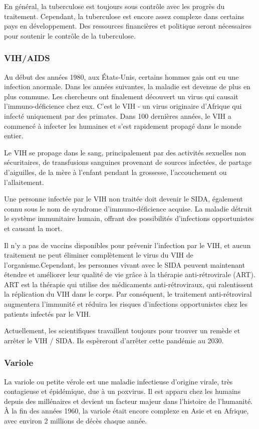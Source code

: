 En général, la tuberculose est toujours sous contrôle avec les progrès du traitement. Cependant, la tuberculose est encore assez complexe dans certains pays en développement. Des ressources financières et politique seront nécessaires pour soutenir le contrôle de la tuberculose.
\subsubsection{VIH/AIDS}

Au début des années 1980, aux États-Unis, certains hommes gais ont eu une infection anormale. Dans les années suivantes, la maladie est devenue de plus en plus commune. Les chercheurs ont finalement découvert un virus qui causait l'immuno-déficience chez eux. C'est le VIH - un virus originaire d'Afrique qui infecté uniquement par des primates. Dans 100 dernières années, le VIH a commencé à infecter les humaines et s'est rapidement propagé dans le monde entier. 

Le VIH se propage dans le sang, principalement par des activités sexuelles non sécuritaires, de transfusions sanguines provenant de sources infectées, de partage d'aiguilles, de la mère à l'enfant pendant la grossesse, l'accouchement ou l'allaitement.

Une personne infectée par le VIH non traitée doit devenir le SIDA, également connu sous le nom de syndrome d'immuno-déficience acquise. La maladie détruit le système immunitaire humain, offrant des possibilités d'infections opportunistes et causant la mort.

Il n'y a pas de vaccins disponibles pour prévenir l'infection par le VIH, et aucun traitement ne peut éliminer complètement le virus du VIH de l'organisme.Cependant, les personnes vivant avec le SIDA peuvent maintenant étendre et améliorer leur qualité de vie grâce à la thérapie anti-rétrovirale (ART). ART est la thérapie qui utilise des médicaments anti-rétroviraux, qui ralentissent la réplication du VIH dans le corps. Par conséquent, le traitement anti-rétroviral augmentera l'immunité et réduira les risques d'infections opportunistes chez les patients infectés par le VIH.

Actuellement, les scientifiques travaillent toujours pour trouver un remède et arrêter le VIH / SIDA. Ils espèreront
d'arrêter cette pandémie au 2030.

\subsubsection{Variole}
La variole ou petite vérole est une maladie infectieuse d'origine virale, très contagieuse et épidémique, due à un poxvirus. Il est apparu chez les humains depuis des millénaires et devient un facteur majeur dans l'histoire de l'humanité. À la fin des années 1960, la variole était encore complexe en Asie et en Afrique, avec environ 2 millions de décès chaque année.

